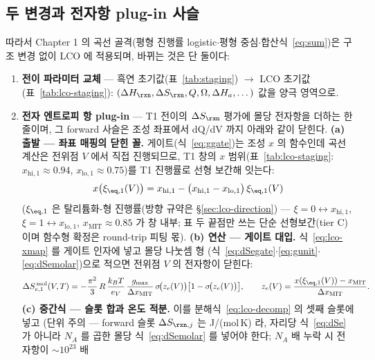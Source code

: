 \subsection{두 변경과 전자항 plug-in 사슬}\label{sec:lco-code-plugin}
따라서 Chapter 1 의 곡선 골격(평형 진행률 logistic$\cdot$평형 중심$\cdot$합산식~\eqref{eq:sum})은 구조 변경 없이
LCO 에 적용되며, 바뀌는 것은 단 둘이다:
\begin{enumerate}[label=(\roman*),leftmargin=2.2em,itemsep=1pt]
\item \textbf{전이 파라미터 교체} --- 흑연 초기값(표~\ref{tab:staging}) $\to$ LCO 초기값(표~\ref{tab:lco-staging}):
$(\Delta H_\rxn,\Delta S_\rxn,Q,\Omega,\Delta H_a,\dots)$ 값을 양극 영역으로.
\item \textbf{전자 엔트로피 항 plug-in} --- T1 전이의 $\Delta S_{\rxn}$ 평가에 몰당 전자항을 더하는 한 줄이며,
그 forward 사슬은 조성 좌표에서 dQ/dV 까지 아래와 같이 닫힌다.
\textbf{(a) 출발 --- 좌표 매핑의 닫힌 꼴.} 게이트(식~\eqref{eq:ggate})는 조성 $x$ 의 함수인데 곡선 계산은
전위점 $V$ 에서 직접 진행되므로, T1 창의 $x$ 범위(표~\ref{tab:lco-staging}: $x_{\mathrm{hi},1}{\approx}0.94$,
$x_{\mathrm{lo},1}{\approx}0.75$)를 T1 진행률로 선형 보간해 잇는다:
\begin{equation}
x\big(\xi_{\eq,1}(V)\big)=x_{\mathrm{hi},1}-\big(x_{\mathrm{hi},1}-x_{\mathrm{lo},1}\big)\,\xi_{\eq,1}(V)
\label{eq:lco-xmap}
\end{equation}
($\xi_{\eq,1}$ 은 탈리튬화-형 진행률(방향 규약은 \S\ref{sec:lco-direction}) --- $\xi{=}0\leftrightarrow x_{\mathrm{hi},1}$, $\xi{=}1\leftrightarrow x_{\mathrm{lo},1}$, $x_\mathrm{MIT}{\approx}0.85$ 가 창 내부; 표 두 끝점만 쓰는 단순 선형보간(tier C)이며 함수형 확정은 round-trip 피팅 몫).
\textbf{(b) 연산 --- 게이트 대입.} 식~\eqref{eq:lco-xmap} 를 게이트 인자에 넣고 몰당 나눗셈 형
(식~\eqref{eq:dSegate}$\cdot$\eqref{eq:gunit}$\cdot$\eqref{eq:dSemolar})으로 적으면 전위점 $V$ 의
전자항이 닫힌다:
\begin{equation}
\Delta S_{e,1}^{\,\mathrm{mol}}(V,T)
=-\frac{\pi^2}{3}\,R\,\frac{k_BT}{e_V}\,\frac{g_{\max}}{\Delta x_\mathrm{MIT}}\,
\sigma\!\big(z_e(V)\big)\big[1-\sigma\!\big(z_e(V)\big)\big],
\qquad z_e(V)=\frac{x(\xi_{\eq,1}(V))-x_\mathrm{MIT}}{\Delta x_\mathrm{MIT}}.
\label{eq:lco-SeV}
\end{equation}
\textbf{(c) 중간식 --- 슬롯 합과 온도 적분.} 이를 분해식~\eqref{eq:lco-decomp} 의 셋째 슬롯에 넣고
(단위 주의 --- forward 슬롯 $\Delta S_{\rxn,j}$ 는 J/(mol\,K) 라, 자리당 식~\eqref{eq:dSe} 가 아니라
$N_A$ 를 곱한 몰당 식~\eqref{eq:dSemolar} 를 넣어야 한다; $N_A$ 배 누락 시 전자항이 $\sim10^{23}$ 배

\end{enumerate}
